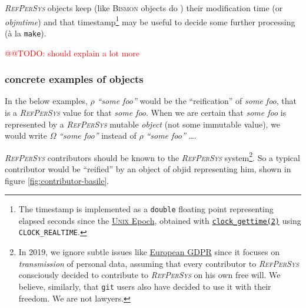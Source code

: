 \documentclass[11pt,a4paper,svgnames]{article}
\newcommand{\RefPerSys}{{\textit{\textsc{RefPerSys}}}}
\begin{document}
{\RefPerSys} objects keep (like \textsc{Bismon} objects do
\cite{Starynkevitch:2019:bismon-draft}) their modification time (or
\emph{objmtime}) and that timestamp\footnote{The timestamp is
implemented as a \texttt{double} floating point representing elapsed
seconds since the
\href{https://en.wikipedia.org/wiki/Unix_time}{\textsc{Unix} Epoch},
obtained with
\href{http://man7.org/linux/man-pages/man2/clock_gettime.2.html}{\texttt{clock\_gettime(2)}}
using \texttt{CLOCK\_REALTIME}.} may be useful to decide some further
processing (à la \texttt{make}).

\smallskip

\textcolor{red}{@@TODO: should explain a lot more}

\bigskip

\subsubsection{concrete examples of objects}
\label{subsubsec:obj-examples}

In the below examples, $\rho$ \emph{``some foo''}  would be
the ``reification'' of \textit{some foo}, that is a {\RefPerSys} value
for that \textit{some foo}. When we are certain that \textit{some foo}
is represented by a {\RefPerSys} mutable \emph{object} (not some immutable value), we
would write $\Omega$  \emph{``some foo''} instead of
$\rho$  \emph{``some foo''} \ldots.

\medskip

{\RefPerSys} contributors should be known to the {\RefPerSys}
system\footnote{In 2019, we ignore subtle issues like
\href{https://eugdpr.org/}{European GDPR} since it focuses on
\emph{transmission} of personal data, assuming that every contributor
to {\RefPerSys} consciously decided to contribute to {\RefPerSys} on
his own free will. We believe, similarly, that \texttt{git} users
also have decided to use it with their freedom. We are not
lawyers.}. So a typical contributor would be ``reified'' by an object
of objid {} representing
him, shown in figure \ref{fig:contributor-basile}.
\end{document}
